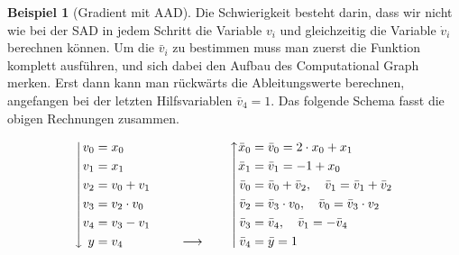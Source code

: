 \documentclass[
  a4paper,
  DIV=11]{scrreprt}
\theoremstyle{definition}
\theoremstyle{definition}
\newtheorem{example}{Beispiel}[chapter]
\theoremstyle{remark}
\begin{document}
\begin{example}[Gradient mit
AAD]
Die Schwierigkeit besteht darin, dass wir nicht wie bei der SAD in jedem
Schritt die Variable \(v_i\) und gleichzeitig die Variable \(\dot v_i\)
berechnen können. Um die \(\bar v_i\) zu bestimmen muss man zuerst die
Funktion komplett ausführen, und sich dabei den Aufbau des Computational
Graph merken. Erst dann kann man rückwärts die Ableitungswerte
berechnen, angefangen bei der letzten Hilfsvariablen \(\bar v_4 = 1\).
Das folgende Schema fasst die obigen Rechnungen zusammen.

\begin{equation*}
\left \downarrow 
    \begin{aligned}[c] 
        v_0 &= x_0 \\ 
        v_1 &= x_1 \\
        v_2 &= v_0 + v_1 \\
        v_3 &= v_2 \cdot v_0 \\
        v_4 &= v_3 - v_1 \\
        y &= v_4
    \end{aligned}  
\right .

\qquad

\begin{aligned}[c] 
    & \\ 
    & \\
    & \\
    & \\
    & \\
    &\longrightarrow
\end{aligned}  

\qquad

\left \uparrow 
    \begin{aligned}[c] 
        \bar x_0 &= \bar v_0 = 2\cdot x_0 + x_1 \\ 
        \bar x_1 &= \bar v_1 = -1 + x_0 \\
        \bar v_0 &= \bar v_0 + \bar v_2, \quad \bar v_1 = \bar v_1 + \bar v_2 \\
        \bar v_2 &= \bar v_3 \cdot v_0, \quad \bar v_0 = \bar v_3 \cdot v_2 \\
        \bar v_3 &= \bar v_4, \quad \bar v_1 = -\bar v_4 \\
        \bar v_4 &= \bar y = 1
    \end{aligned}  
\right . 
\end{equation*}


\end{example}
\end{document}

